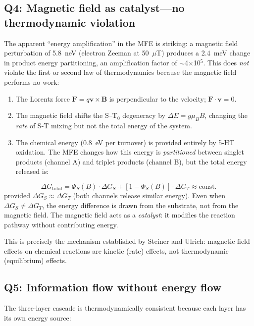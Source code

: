 \documentclass[11pt]{article}
\begin{document}
\subsection{Q4: Magnetic field as catalyst---no thermodynamic violation}

The apparent ``energy amplification'' in the MFE is striking: a magnetic field perturbation of 5.8~neV (electron Zeeman at 50~$\mu$T) produces a 2.4~meV change in product energy partitioning, an amplification factor of $\sim$4$\times$10$^5$. This does \emph{not} violate the first or second law of thermodynamics because the magnetic field performs no work:

\begin{enumerate}
\item The Lorentz force $\mathbf{F} = q\mathbf{v} \times \mathbf{B}$ is perpendicular to the velocity; $\mathbf{F} \cdot \mathbf{v} = 0$.
\item The magnetic field shifts the S--T$_0$ degeneracy by $\Delta E = g\mu_B B$, changing the \emph{rate} of S-T mixing but not the total energy of the system.
\item The chemical energy (0.8~eV per turnover) is provided entirely by 5-HT oxidation. The MFE changes how this energy is \emph{partitioned} between singlet products (channel A) and triplet products (channel B), but the total energy released is:
\end{enumerate}
\begin{equation}
\Delta G_\mathrm{total} = \Phi_S(B) \cdot \Delta G_S + [1 - \Phi_S(B)] \cdot \Delta G_T \approx \text{const.}
\label{eq:energy_conserve}
\end{equation}
provided $\Delta G_S \approx \Delta G_T$ (both channels release similar energy). Even when $\Delta G_S \neq \Delta G_T$, the energy difference is drawn from the substrate, not from the magnetic field. The magnetic field acts as a \emph{catalyst}: it modifies the reaction pathway without contributing energy.

This is precisely the mechanism established by Steiner and Ulrich\cite{Steiner1989}: magnetic field effects on chemical reactions are kinetic (rate) effects, not thermodynamic (equilibrium) effects.

\subsection{Q5: Information flow without energy flow}

The three-layer cascade is thermodynamically consistent because each layer has its own energy source:
\end{document}
